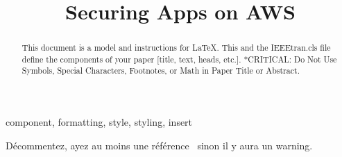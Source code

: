 \documentclass[conference]{IEEEtran}
\renewcommand{\doctitle}{Securing Apps on AWS}
\begin{document}
\title{\doctitle}


\newpage


\begin{abstract}
This document is a model and instructions for \LaTeX.
This and the IEEEtran.cls file define the components of your paper [title, text, heads, etc.]. *CRITICAL: Do Not Use Symbols, Special Characters, Footnotes, 
or Math in Paper Title or Abstract.
\end{abstract}

\begin{IEEEkeywords}
component, formatting, style, styling, insert
\end{IEEEkeywords}



Décommentez, ayez au moins une référence~\cite{ghelani2022cyber} sinon il y aura un warning.





\end{document}
